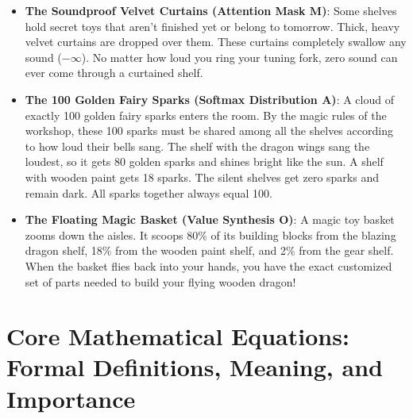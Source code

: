 \documentclass[11pt,a4paper]{article}
\theoremstyle{definition}
\begin{document}
\begin{itemize}
    \item \textbf{The Soundproof Velvet Curtains (Attention Mask $\mathbf{M}$)}:
    Some shelves hold secret toys that aren't finished yet or belong to tomorrow. Thick, heavy velvet curtains are dropped over them. These curtains completely swallow any sound ($-\infty$). No matter how loud you ring your tuning fork, zero sound can ever come through a curtained shelf.
    
    \item \textbf{The 100 Golden Fairy Sparks (Softmax Distribution $\mathbf{A}$)}:
    A cloud of exactly 100 golden fairy sparks enters the room. By the magic rules of the workshop, these 100 sparks must be shared among all the shelves according to how loud their bells sang. The shelf with the dragon wings sang the loudest, so it gets 80 golden sparks and shines bright like the sun. A shelf with wooden paint gets 18 sparks. The silent shelves get zero sparks and remain dark. All sparks together always equal 100.
    
    \item \textbf{The Floating Magic Basket (Value Synthesis $\mathbf{O}$)}:
    A magic toy basket zooms down the aisles. It scoops 80\% of its building blocks from the blazing dragon shelf, 18\% from the wooden paint shelf, and 2\% from the gear shelf. When the basket flies back into your hands, you have the exact customized set of parts needed to build your flying wooden dragon!
\end{itemize}

\section{Core Mathematical Equations: Formal Definitions, Meaning, and Importance}
\end{document}
